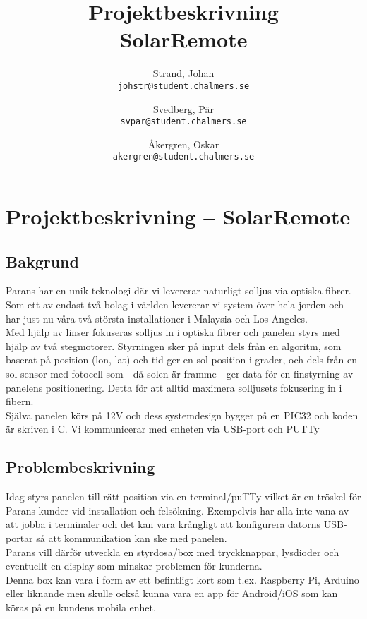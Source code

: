 \documentclass{article}
\author{	Strand, Johan \\ \texttt{johstr@student.chalmers.se} \and
			Svedberg, Pär\\ \texttt{svpar@student.chalmers.se} \and
			Åkergren, Oskar\\ \texttt{akergren@student.chalmers.se}
}
\title{Projektbeskrivning  \\ SolarRemote}
\begin{document}
\section*{Projektbeskrivning -- SolarRemote} %
\label{sec:projekt}

	\subsection*{Bakgrund} %
	\label{sub:bakgrund}

	\noindent Parans har en unik teknologi där vi levererar naturligt solljus via optiska fibrer.
	Som ett av endast två bolag i världen levererar vi system över hela jorden och har just nu våra två största installationer i Malaysia och Los Angeles.\\

	\noindent Med hjälp av linser fokuseras solljus in i optiska fibrer och panelen styrs med hjälp av två stegmotorer. Styrningen sker på input dels från en algoritm, som baserat på position (lon, lat) och tid ger en sol-position i grader, och dels från en sol-sensor med fotocell som - då solen är framme - ger data för en finstyrning av panelens positionering.
	Detta för att alltid maximera solljusets fokusering in i fibern.\\

	\noindent Själva panelen körs på 12V och dess systemdesign bygger på en PIC32 och
	koden är skriven i C. Vi kommunicerar med enheten via USB-port och PUTTy


	\subsection*{Problembeskrivning} %
	\label{sub:problem}

	\noindent Idag styrs panelen till rätt position via en terminal/puTTy vilket är en tröskel för Parans kunder vid installation och felsökning. 
	Exempelvis har alla inte vana av att jobba i terminaler och det kan vara krångligt att konfigurera datorns USB-portar så att kommunikation kan ske med panelen. \\

	\noindent Parans vill därför utveckla en styrdosa/box med tryckknappar, lysdioder och eventuellt en display som minskar problemen för kunderna. \\
	Denna box kan vara i form av ett befintligt kort som t.ex. Raspberry Pi, Arduino eller liknande men skulle också kunna vara en app för Android/iOS som kan köras på en kundens mobila enhet.
\end{document}
